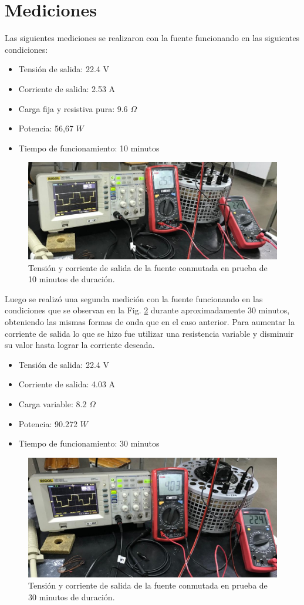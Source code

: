 \documentclass[11pt, a4paper]{article}
\begin{document}
\section{Mediciones}
Las siguientes mediciones se realizaron con la fuente funcionando en las siguientes condiciones:
\begin{itemize}
	\item Tensión de salida: 22.4 V
	\item Corriente de salida: 2.53 A
	\item Carga fija y resistiva pura: 9.6 $\Omega$
	\item Potencia: 56,67 $W$
	\item Tiempo de funcionamiento: 10 minutos	
\end{itemize}

\begin{figure}[h]
	\centering
	\includegraphics[width = 8 cm]{Imagenes/VIfuncA}
	\caption{Tensión y corriente de salida de la fuente conmutada en prueba de 10 minutos de duración.}
	\label{VIfunc}
\end{figure}

Luego se realizó una segunda medición con la fuente funcionando en las condiciones que se observan en la Fig. \ref{VIfunc} durante aproximadamente 30 minutos, obteniendo las mismas formas de onda que en el caso anterior. Para aumentar la corriente de salida lo que se hizo fue utilizar una resistencia variable y disminuir su valor hasta lograr la corriente deseada.
\begin{itemize}
	\item Tensión de salida: 22.4 V
	\item Corriente de salida: 4.03 A
	\item Carga variable: 8.2 $\Omega$
	\item Potencia: 90.272 $W$
	\item Tiempo de funcionamiento: 30 minutos	
\end{itemize}

\begin{figure}[h]
	\centering
	\includegraphics[width = 8 cm]{Imagenes/VIfuncB}
	\caption{Tensión y corriente de salida de la fuente conmutada en prueba de 30 minutos de duración.}
	\label{VIfunc}
\end{figure}
\end{document}
